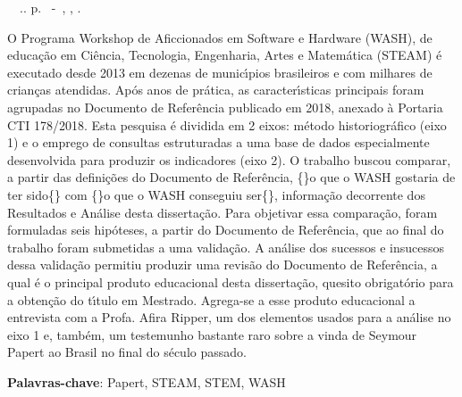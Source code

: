 \setlength{\absparsep}{18pt} %
\begin{resumo}
\begin{flushleft} 
\setlength{\absparsep}{0pt} %
\SingleSpacing 
\imprimirautorabr~~\textbf{\imprimirtituloresumo}.\imprimirdata. \pageref{LastPage}p. 
\imprimirtipotrabalho~-~\imprimirinstituicao, \imprimirlocal, \imprimirdata. 
 \end{flushleft}
\OnehalfSpacing 
O  Programa Workshop de Aficcionados em Software e Hardware (WASH), de educa\c{c}\~ao em Ci\^encia, Tecnologia, Engenharia, Artes e Matem\'atica (STEAM) \'e executado desde 2013 em dezenas de munic\'{\i}pios brasileiros e com milhares de crian\c{c}as atendidas. Ap\'os anos de pr\'atica, as caracter\'{\i}sticas principais foram agrupadas no Documento de Refer\^encia publicado em 2018, anexado \`a Portaria CTI 178/2018. Esta pesquisa \'e dividida em 2 eixos: m\'etodo historiogr\'afico (eixo 1) e o emprego de consultas estruturadas a uma base de dados especialmente desenvolvida para produzir os indicadores (eixo 2). O trabalho buscou comparar, a partir das defini\c{c}\~oes do Documento de Refer\^encia, \textquotedbl\{\}o que o WASH gostaria de ter sido\textquotedbl\{\} com \textquotedbl\{\}o que o WASH conseguiu ser\textquotedbl\{\}, informa\c{c}\~ao decorrente dos Resultados e An\'alise desta disserta\c{c}\~ao. Para objetivar essa compara\c{c}\~ao, foram formuladas seis hip\'oteses, a partir do Documento de Refer\^encia, que ao final do trabalho foram submetidas a uma valida\c{c}\~ao.  A an\'alise dos sucessos e insucessos dessa valida\c{c}\~ao permitiu produzir uma revis\~ao do Documento de Refer\^encia, a qual \'e o principal produto educacional desta disserta\c{c}\~ao, quesito obrigat\'orio para a obten\c{c}\~ao do t\'{\i}tulo em Mestrado. Agrega-se a esse produto educacional a entrevista com a Profa. Afira Ripper, um dos elementos usados para a an\'alise no eixo 1 e, tamb\'em, um testemunho bastante raro sobre a vinda de Seymour Papert ao Brasil no final do s\'eculo passado.
 

 \textbf{Palavras-chave}: Papert, STEAM, STEM, WASH
\end{resumo}